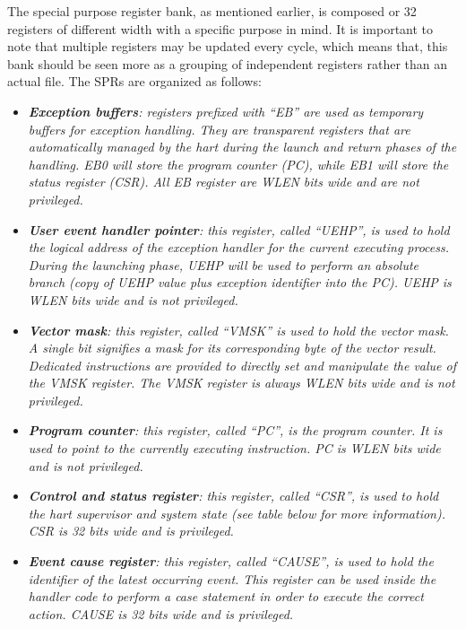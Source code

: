             The special purpose register bank, as mentioned earlier, is composed or 32 registers of different width with a specific purpose in mind. It is important to note that multiple registers may be updated every cycle, which means that, this bank should be seen more as a grouping of independent registers rather than an actual file. The SPRs are organized as follows:

            \begin{itemize}

                \item \textit{\textbf{Exception buffers}: registers prefixed with ``EB'' are used as temporary buffers for exception handling. They are transparent registers that are automatically managed by the hart during the launch and return phases of the handling. EB0 will store the program counter (PC), while EB1 will store the status register (CSR). All EB register are WLEN bits wide and are not privileged.}

                \item \textit{\textbf{User event handler pointer}: this register, called ``UEHP'', is used to hold the logical address of the exception handler for the current executing process. During the launching phase, UEHP will be used to perform an absolute branch (copy of UEHP value plus exception identifier into the PC). UEHP is WLEN bits wide and is not privileged.}

                \item \textit{\textbf{Vector mask}: this register, called ``VMSK'' is used to hold the vector mask. A single bit signifies a mask for its corresponding byte of the vector result. Dedicated instructions are provided to directly set and manipulate the value of the VMSK register. The VMSK register is always WLEN bits wide and is not privileged.}

                \item \textit{\textbf{Program counter}: this register, called ``PC'', is the program counter. It is used to point to the currently executing instruction. PC is WLEN bits wide and is not privileged.}

                \item \textit{\textbf{Control and status register}: this register, called ``CSR'', is used to hold the hart supervisor and system state (see table below for more information). CSR is 32 bits wide and is privileged.}

                \item \textit{\textbf{Event cause register}: this register, called ``CAUSE'', is used to hold the identifier of the latest occurring event. This register can be used inside the handler code to perform a case statement in order to execute the correct action. CAUSE is 32 bits wide and is privileged.}


\end{itemize}
